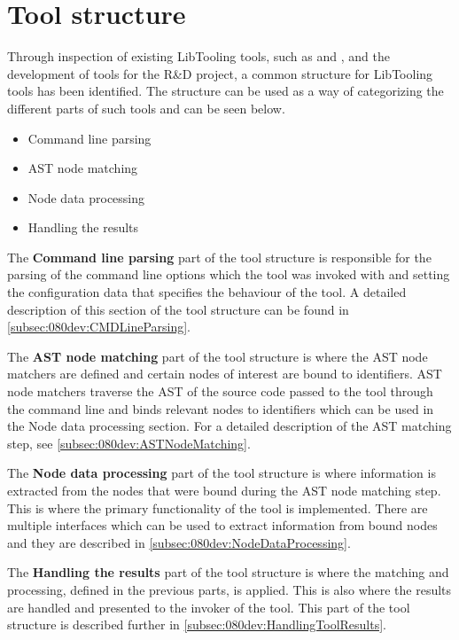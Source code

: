 \section{Tool structure} \label{sec:080dev:tool_structure}

Through inspection of existing LibTooling tools, such as \cite{llvmExternalClangExamples} and \cite{llvmLLVMCompilerInfrastructure2023}, and the development of tools for the R\&D project, a common structure for LibTooling tools has been identified. The structure can be used as a way of categorizing the different parts of such tools and can be seen below.

\begin{itemize}
    \item Command line parsing
    \item AST node matching
    \item Node data processing
    \item Handling the results
\end{itemize}

The \textbf{Command line parsing} part of the tool structure is responsible for the parsing of the command line options which the tool was invoked with and setting the configuration data that specifies the behaviour of the tool. A detailed description of this section of the tool structure can be found in \cref{subsec:080dev:CMDLineParsing}.

The \textbf{AST node matching} part of the tool structure is where the AST node matchers are defined and certain nodes of interest are bound to identifiers. AST node matchers traverse the AST of the source code passed to the tool through the command line and binds relevant nodes to identifiers which can be used in the Node data processing section. For a detailed description of the AST matching step, see \cref{subsec:080dev:ASTNodeMatching}.

The \textbf{Node data processing} part of the tool structure is where information is extracted from the nodes that were bound during the AST node matching step. This is where the primary functionality of the tool is implemented. There are multiple interfaces which can be used to extract information from bound nodes and they are described in \cref{subsec:080dev:NodeDataProcessing}.

The \textbf{Handling the results} part of the tool structure is where the matching and processing, defined in the previous parts, is applied. This is also where the results are handled and presented to the invoker of the tool. This part of the tool structure is described further in \cref{subsec:080dev:HandlingToolResults}.


